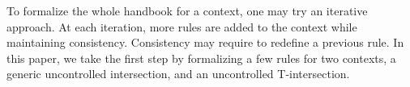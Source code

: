 To formalize the whole handbook for a context,
one may try an iterative approach.
At each iteration,
more rules are added to the context
while maintaining consistency.
Consistency may require to redefine a previous rule.
In this paper,
we take the first step
by formalizing a few rules for two contexts,
a generic uncontrolled intersection,
and an uncontrolled T-intersection.
